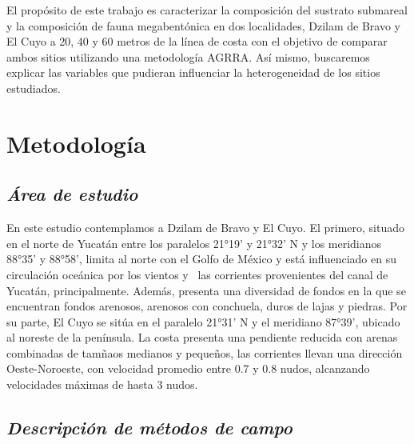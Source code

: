 \documentclass[
  authoryear,
  preprint,
  3p,
  twocolumn]{elsarticle}
\begin{document}
El propósito de este trabajo es caracterizar la composición del sustrato
submareal y la composición de fauna megabentónica en dos localidades,
Dzilam de Bravo y El Cuyo a 20, 40 y 60 metros de la línea de costa con
el objetivo de comparar ambos sitios utilizando una metodología AGRRA.
Así mismo, buscaremos explicar las variables que pudieran influenciar la
heterogeneidad de los sitios estudiados.

\hypertarget{metodologuxeda}{%
\section{Metodología}\label{metodologuxeda}}

\hypertarget{uxe1rea-de-estudio}{%
\subsection{\texorpdfstring{\emph{Área de
estudio}}{Área de estudio}}\label{uxe1rea-de-estudio}}

En este estudio contemplamos a Dzilam de Bravo y El Cuyo. El primero,
situado en el norte de Yucatán entre los paralelos 21°19' y 21°32' N y
los meridianos 88°35' y 88°58', limita al norte con el Golfo de México y
está influenciado en su circulación oceánica por los vientos y~ las
corrientes provenientes del canal de Yucatán,
principalmente\citep{1834/36164}. Además, presenta una diversidad de
fondos en la que se encuentran fondos arenosos, arenosos con conchuela,
duros de lajas y piedras\citep{1834/36164}. Por su parte, El Cuyo se
sitúa en el paralelo 21°31' N y el meridiano 87°39', ubicado al noreste
de la península\citep{cnarioCuyo}. La costa presenta una pendiente
reducida con arenas combinadas de tamñaos medianos y pequeños, las
corrientes llevan una dirección Oeste-Noroeste, con velocidad promedio
entre 0.7 y 0.8 nudos, alcanzando velocidades máximas de hasta 3
nudos\citep{cnarioCuyo}.

\hypertarget{descripciuxf3n-de-muxe9todos-de-campo}{%
\subsection{\texorpdfstring{\emph{Descripción de métodos de
campo}}{Descripción de métodos de campo}}\label{descripciuxf3n-de-muxe9todos-de-campo}}
\end{document}

